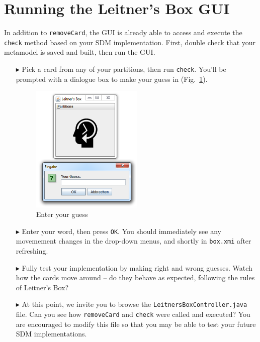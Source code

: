 \newpage
\hypertarget{sec:extendGui}{}
\section{Running the Leitner's Box GUI}
\genHeader

In addition to \texttt{removeCard}, the GUI is already able to access and execute the \texttt{check} method based on your SDM implementation. First, double
check that your metamodel is saved and built, then run the GUI. 

\begin{itemize}
\item[$\blacktriangleright$] Pick a card from any of your partitions, then run \texttt{check}. You'll be prompted with a dialogue box to make your guess in
(Fig.~\ref{fig:checkGuess}).

\begin{figure}[htp]
\begin{center}
  \includegraphics[width=0.5\textwidth]{eclipse_checkGuess}
  \caption{Enter your guess}
  \label{fig:checkGuess}
\end{center}
\end{figure}

\item[$\blacktriangleright$] Enter your word, then press \texttt{OK}. You should immediately see any movemement changes in the drop-down menus, and shortly in
\texttt{box.xmi} after refreshing.

\item[$\blacktriangleright$] Fully test your implementation by making right and wrong guesses. Watch how the cards move around -- do they
behave as expected, following the rules of Leitner's Box?

\item[$\blacktriangleright$] At this point, we invite you to browse the \texttt{Leitners\-Box\-Control\-ler.java} file. Can you see how \texttt{removeCard} and
\texttt{check} were called and executed? You are encouraged to modify this file so that you may be able to test your future SDM implementations.

\end{itemize}
